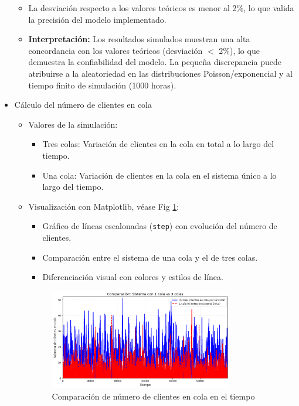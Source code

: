 \documentclass{article}
\begin{document}
\begin{itemize}
\begin{itemize}
            \newpage

            \item La desviación respecto a los valores teóricos es menor al 2\%, lo que valida la precisión del modelo implementado.

            \item \textbf{Interpretación:} Los resultados simulados muestran una alta concordancia con los valores teóricos (desviación $<$ 2\%), lo que demuestra la confiabilidad del modelo. La pequeña discrepancia puede atribuirse a la aleatoriedad en las distribuciones Poisson/exponencial y al tiempo finito de simulación (1000 horas).
        \end{itemize}

    \item Cálculo del número de clientes en cola
        \begin{itemize}
            \item Valores de la simulación:
                \begin{itemize}
                    \item Tres colas: Variación de clientes en la cola en total a lo largo del tiempo.
                    \item Una cola: Variación de clientes en la cola en el sistema único a lo largo del tiempo.
                \end{itemize}
        
            \item Visualización con Matplotlib, véase Fig \ref{fig:clientes_cola}:
                \begin{itemize}
                    \item Gráfico de líneas escalonadas (\texttt{step}) con evolución del número de clientes.
                    \item Comparación entre el sistema de una cola y el de tres colas.
                    \item Diferenciación visual con colores y estilos de línea.
                \end{itemize}
                \begin{figure}[h]
                    \centering
                    \includegraphics[width=0.8\textwidth]{./images/Numero de clientes en cola.png}
                    \caption{Comparación de número de clientes en cola en el tiempo}
                    \label{fig:clientes_cola}
                \end{figure}


\end{itemize}
\end{itemize}
\end{document}
